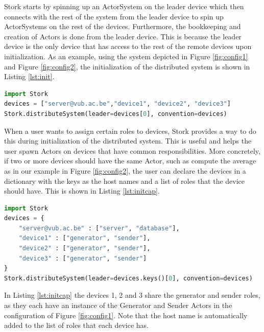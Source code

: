 \documentclass[a4paper]{article}
\begin{document}
Stork starts by spinning up an ActorSystem on the leader device which then connects with the rest of the system from the leader device to spin up ActorSystems on the rest of the devices. Furthermore, the bookkeeping and creation of Actors is done from the leader device. This is because the leader device is the only device that has access to the rest of the remote devices upon initialization. As an example, using the system depicted in Figure \ref{fig:config1} and Figure \ref{fig:config2}, the initialization of the distributed system is shown in Listing \ref{lst:init}.
\begin{lstlisting}[language=Python, caption=Initializing the distributed system, label=lst:init]
import Stork
devices = ["server@vub.ac.be","device1", "device2", "device3"]
Stork.distributeSystem(leader=devices[0], convention=devices)
\end{lstlisting}
When a user wants to assign certain roles to devices, Stork provides a way to do this during initialization of the distributed system. This is useful and helps the user spawn Actors on devices that have common responsibilities. More concretely, if two or more devices should have the same Actor, such as compute the average as in our example in Figure \ref{fig:config2}, the user can declare the devices in a dictionary with the keys as the host names and a list of roles that the device should have. This is shown in Listing \ref{lst:initcap}.
\vfill
\begin{lstlisting}[language=Python, caption=Initializing the distributed system with devices have common roles, label=lst:initcap]
import Stork
devices = {
    "server@vub.ac.be" : ["server", "database"],
    "device1" : ["generator", "sender"],
    "device2" : ["generator", "sender"],
    "device3" : ["generator", "sender"]
}
Stork.distributeSystem(leader=devices.keys()[0], convention=devices)
\end{lstlisting}
In Listing \ref{lst:initcap} the devices 1, 2 and 3 share the generator and sender roles, as they each have an instance of the Generator and Sender Actors in the configuration of Figure \ref{fig:config1}. Note that the host name is automatically added to the list of roles that each device has.
\end{document}
